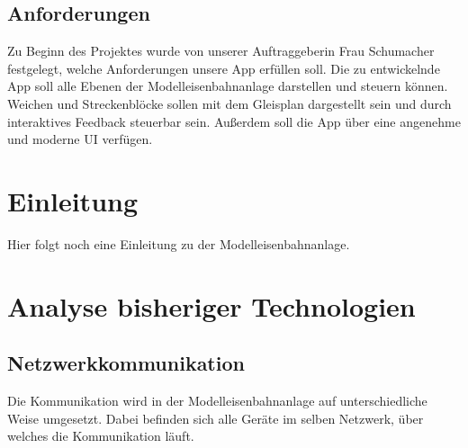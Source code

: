 \documentclass{article}
\begin{document}
\subsection{Anforderungen}
Zu Beginn des Projektes wurde von unserer Auftraggeberin Frau Schumacher festgelegt, welche Anforderungen unsere App erfüllen soll.
Die zu entwickelnde App soll alle Ebenen der Modelleisenbahnanlage darstellen und steuern können.
Weichen und Streckenblöcke sollen mit dem Gleisplan dargestellt sein und durch interaktives Feedback steuerbar sein.
Außerdem soll die App über eine angenehme und moderne UI verfügen.

\section{Einleitung}\label{einleitung}
Hier folgt noch eine Einleitung zu der Modelleisenbahnanlage.


\section{Analyse bisheriger Technologien}
\subsection{Netzwerkkommunikation}
Die Kommunikation wird in der Modelleisenbahnanlage auf unterschiedliche Weise umgesetzt.
Dabei befinden sich alle Geräte im selben Netzwerk, über welches die Kommunikation läuft.
\end{document}

